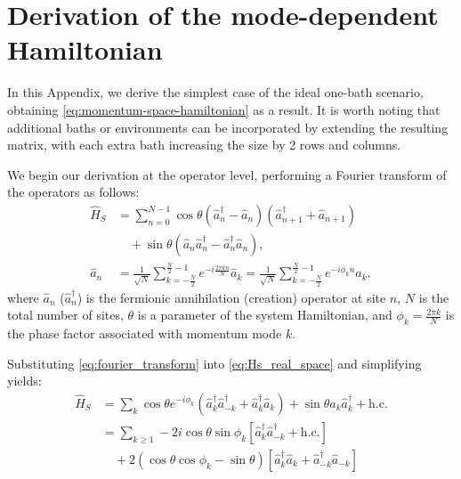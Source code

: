 \section{Derivation of the mode-dependent Hamiltonian}\label{app:Hk_derivation}

In this Appendix, we derive the simplest case of the ideal one-bath scenario, obtaining \cref{eq:momentum-space-hamiltonian} as a result. It is worth noting that additional baths or environments can be incorporated by extending the resulting matrix, with each extra bath increasing the size by 2 rows and columns.

We begin our derivation at the operator level, performing a Fourier transform of the operators as follows:
\begin{align}
    \hat{H}_S &= \sum_{n=0}^{N-1} \cos\theta(\hat{a}_n^{\dag}-\hat{a}_n)(\hat{a}_{n+1}^{\dag}+\hat{a}_{n+1}) \nonumber\\
	          &\quad + \sin\theta(\hat{a}_n\hat{a}_n^\dag-\hat{a}_n^\dag \hat{a}_n), \label{eq:Hs_real_space}\\
    \hat{a}_n &= \frac{1}{\sqrt{N}}\sum_{k=-\frac{N}{2}}^{\frac{N}{2}-1}e^{-i\frac{2\pi k n}{N}}\hat{a}_k = \frac{1}{\sqrt{N}}\sum_{k=-\frac{N}{2}}^{\frac{N}{2}-1}e^{-i\phi_k n}\hat{a}_k, \label{eq:fourier_transform}
\end{align}
where $\hat{a}_n$ ($\hat{a}_n^\dag$) is the fermionic annihilation (creation) operator at site $n$, $N$ is the total number of sites, $\theta$ is a parameter of the system Hamiltonian, and $\phi_k = \frac{2\pi k}{N}$ is the phase factor associated with momentum mode $k$.

Substituting \cref{eq:fourier_transform} into \cref{eq:Hs_real_space} and simplifying yields:
\begin{align}
    \hat{H}_S &= \sum_k \cos\theta e^{-i\phi_k}(\hat{a}_k^\dag \hat{a}_{-k}^\dag+\hat{a}_k^\dag \hat{a}_{k})+\sin\theta\hat{a}_k\hat{a}_k^\dag + \text{h.c.} \nonumber\\
	          &= \sum_{k\geq 1}-2i\cos\theta\sin\phi_k[\hat{a}_k^\dag \hat{a}_{-k}^\dag+\text{h.c.}] \nonumber\\
	          &\quad +2(\cos\theta\cos\phi_k-\sin\theta)[\hat{a}_k^\dag \hat{a}_k+\hat{a}_{-k}^\dag \hat{a}_{-k}] \label{eq:Hs_momentum_space}
\end{align}